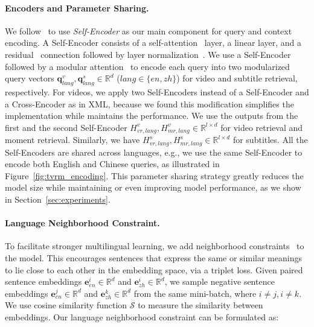 \paragraph{Encoders and Parameter Sharing.}
We follow~\citet{lei2020tvr} to use \textit{Self-Encoder} as our main component for query and context encoding. 
A Self-Encoder consists of a self-attention~\cite{vaswani2017attention} layer, a linear layer, and a residual~\cite{he2016deep} connection followed by layer normalization~\cite{ba2016layer}.
We use a Self-Encoder followed by a modular attention~\cite{lei2020tvr} to encode each query into two modularized query vectors $\boldsymbol{q}^{v}_{lang}, \boldsymbol{q}^{s}_{lang} \in \mathbb{R}^{d}$ ($lang\in \{en, zh\}$) for video and subtitle retrieval, respectively.
For videos, we apply two Self-Encoders instead of a Self-Encoder and a Cross-Encoder as in XML, because we found this modification simplifies the implementation while maintains the performance.
We use the outputs from the first and the second Self-Encoder $H^v_{vr,lang}, H^v_{mr,lang} \in \mathbb{R}^{l \times d}$ for video retrieval and moment retrieval. 
Similarly, we have $H^s_{vr,lang},H^s_{mr,lang} \in \mathbb{R}^{l \times d}$ for subtitles.
All the Self-Encoders are shared across languages, e.g., we use the same Self-Encoder to encode both English and Chinese queries, as illustrated in Figure~\ref{fig:tvrm_encoding}. 
This parameter sharing strategy greatly reduces the model size while maintaining or even improving model performance, as we show in Section~\ref{sec:experiments}.

\paragraph{Language Neighborhood Constraint.}
To facilitate stronger multilingual learning, we add neighborhood constraints~\cite{wang2018learning,kim2020mule,burns2020learning} to the model. 
This encourages sentences that express the same or similar meanings to lie close to each other in the embedding space, via a triplet loss.
Given paired sentence embeddings $\boldsymbol{e}_{en}^{i} \in \mathbb{R}^d$ and $\boldsymbol{e}_{zh}^{i} \in \mathbb{R}^d$, we sample negative sentence embeddings $\boldsymbol{e}_{en}^{j} \in \mathbb{R}^d$ and $\boldsymbol{e}_{zh}^{k} \in \mathbb{R}^d$ from the same mini-batch, where $i \neq j, i \neq k$.
We use cosine similarity function $\mathcal{S}$ to measure the similarity between embeddings.
Our language neighborhood constraint can be formulated as:

